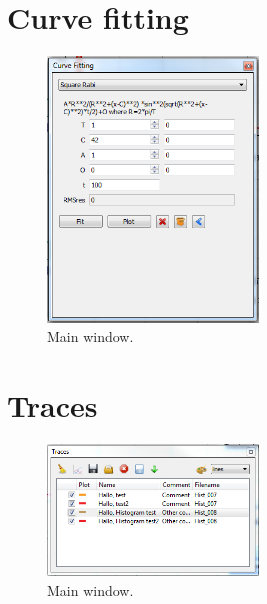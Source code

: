 \documentclass{scrartcl}
\begin{document}
\section{Curve fitting}
\begin{figure}[htbp]
\begin{center}
\includegraphics[width=0.5\textwidth]{CurveFitting}
\end{center}
\caption{\label{AutoloadSettings} Main window.}
\end{figure}

\section{Traces}
\begin{figure}[htbp]
\begin{center}
\includegraphics[width=0.5\textwidth]{Traces}
\end{center}
\caption{\label{AutoloadSettings} Main window.}
\end{figure}
\end{document}
